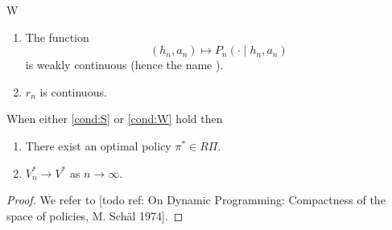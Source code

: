 \documentclass{article}
\begin{document}
\begin{cond}{W}
  \begin{enumerate}
    \item The function
      \[(h_n, a_n) \mapsto P_n(\cdot \mid h_n, a_n)\]
	is weakly continuous (hence the name ).
    \item $r_n$ is continuous.
  \end{enumerate}
  \label{cond:W}
\end{cond}

\begin{thm}
  When either \cref{cond:S} or \cref{cond:W} hold then
  \begin{enumerate}
    \item There exist an optimal policy $\pi^* \in R\Pi$.
    \item $V^*_n \to V^*$ as $n \to \infty$.
  \end{enumerate}
\end{thm}
\begin{proof}
  We refer to [todo ref: On Dynamic Programming: Compactness of the space of
  policies, M. Schäl 1974]. %
\end{proof}
\end{document}

